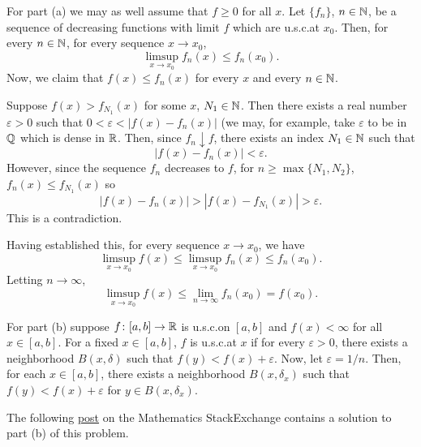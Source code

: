 \begin{solution}
  For part (a) we may as well assume that \(f\geq 0\) for all \(x\). Let
  \(\{f_n\}\), \(n\in\mathbb{N}\), be a sequence of decreasing functions with
  limit \(f\) which are u.s.c.\@ at \(x_0\). Then, for every \(n\in\mathbb{N}\),
  for every sequence \(x\to x_0\),
  \[
    \limsup_{x\to x_0}f_n(x)\leq f_n(x_0).
  \]
  Now, we claim that \(f(x)\leq f_n(x)\) for every \(x\) and every
  \(n\in\mathbb{N}\).
  \begin{subproof}
    Suppose \(f(x)>f_{N_1}(x)\) for some \(x\), \(N_1\in\mathbb{N}\). Then there
    exists a real number \(\varepsilon>0\) such that
    \(0<\varepsilon<|f(x)-f_n(x)|\) (we may, for example, take
    \(\varepsilon\) to be in \(\mathbb{Q}\) which is dense in \(\mathbb{R}\). Then,
    since \(f_n\downarrow f\), there exists an index \(N_1\in\mathbb{N}\) such
    that
    \[
      |f(x)-f_n(x)|<\varepsilon.
    \]
    However, since the sequence \(f_n\) decreases to \(f\), for
    \(n\geq\max\{N_1,N_2\}\), \(f_n(x)\leq f_{N_1}(x)\) so
    \[
      |f(x)-f_n(x)|>|f(x)-f_{N_1}(x)|>\varepsilon.
    \]
    This is a contradiction.
  \end{subproof}
  Having established this, for every sequence \(x\to x_0\), we have
  \[
    \limsup_{x\to x_0} f(x)\leq \limsup_{x\to x_0} f_n(x)\leq f_n(x_0).
  \]
  Letting \(n\to\infty\),
  \[
    \limsup_{x\to x_0} f(x)\leq \lim_{n\to\infty}f_n(x_0)=f(x_0).
  \]

  For part (b) suppose \(f\colon [a,b]\to\mathbb{R}\) is u.s.c.\@ on \([a,b]\)
  and \(f(x)<\infty\) for all \(x\in [a,b]\). For a fixed \(x\in[a,b]\),
  \(f\) is u.s.c.\@ at \(x\) if for every \(\varepsilon>0\), there exists a
  neighborhood \(B(x,\delta)\) such that \(f(y)<f(x)+\varepsilon\). Now,
  let \(\varepsilon=1/n\). Then, for each \(x\in [a,b]\), there exists a
  neighborhood \(B(x,\delta_x)\) such that \(f(y)<f(x)+\varepsilon\) for
  \(y\in B(x,\delta_x)\).

  The following
  \href{http://math.stackexchange.com/questions/462534/recognizing-uppersemicontinuous-function-as-a-pointwise-decreasing-limit}{post}
  on the Mathematics \textsf{StackExchange} contains a solution to part (b)
  of this problem.


\end{solution}

